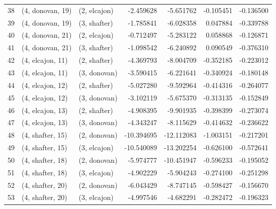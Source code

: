 \begin{tabular}{lllrrrr}
38 &  (4, donovan, 19) &     (2, elcajon) &  -2.459628 &  -5.651762 &  -0.105451 & -0.136500 \\
39 &  (4, donovan, 19) &     (3, shafter) &  -1.785841 &  -6.028358 &   0.047884 & -0.339788 \\
40 &  (4, donovan, 21) &     (2, elcajon) &  -0.712497 &  -5.283122 &   0.058868 & -0.126871 \\
41 &  (4, donovan, 21) &     (3, shafter) &  -1.098542 &  -6.240892 &   0.090549 & -0.376310 \\
42 &  (4, elcajon, 11) &     (2, shafter) &  -4.369793 &  -8.004709 &  -0.352185 & -0.223012 \\
43 &  (4, elcajon, 11) &     (3, donovan) &  -3.590415 &  -6.221641 &  -0.340924 & -0.180148 \\
44 &  (4, elcajon, 12) &     (2, shafter) &  -5.027280 &  -9.592964 &  -0.414316 & -0.264077 \\
45 &  (4, elcajon, 12) &     (3, donovan) &  -3.102119 &  -5.675370 &  -0.313135 & -0.152849 \\
46 &  (4, elcajon, 13) &     (2, shafter) &  -4.908395 &  -9.901935 &  -0.398399 & -0.273074 \\
47 &  (4, elcajon, 13) &     (3, donovan) &  -4.343247 &  -8.115629 &  -0.414632 & -0.236622 \\
48 &  (4, shafter, 15) &     (2, donovan) & -10.394695 & -12.112083 &  -1.003151 & -0.217201 \\
49 &  (4, shafter, 15) &     (3, elcajon) & -10.540089 & -13.202254 &  -0.626100 & -0.572641 \\
50 &  (4, shafter, 18) &     (2, donovan) &  -5.974777 & -10.451947 &  -0.596233 & -0.195052 \\
51 &  (4, shafter, 18) &     (3, elcajon) &  -4.902229 &  -5.904243 &  -0.274100 & -0.251298 \\
52 &  (4, shafter, 20) &     (2, donovan) &  -6.043429 &  -8.747145 &  -0.598427 & -0.156670 \\
53 &  (4, shafter, 20) &     (3, elcajon) &  -4.997546 &  -4.682291 &  -0.282472 & -0.196323 \\
\bottomrule
\end{tabular}

